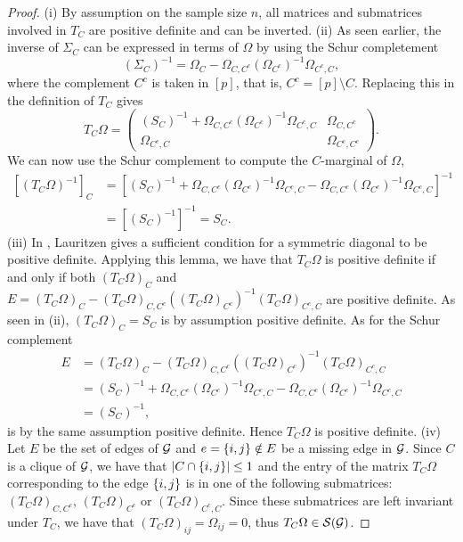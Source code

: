 \begin{proof}
    (i) By assumption on the sample size $n$, all matrices and submatrices involved in $T_C$ are positive definite and can be inverted.
    \newline
    (ii) As seen earlier, the inverse of $\Sigma_C$ can be expressed in terms of $\Omega$ by using the Schur completement
    \begin{equation*}
        (\Sigma_C)^{-1} = \Omega_C - \Omega_{C, C^c}(\Omega_{C^c})^{-1}\Omega_{C^c, C},
    \end{equation*}
    where the complement $C^c$ is taken in $[p]$, that is, $C^c = [p] \setminus C$. Replacing this in the definition of $T_C$ gives
    \begin{equation} \label{eq-tc-2}
        T_C \Omega = \begin{pmatrix}
            (S_C)^{-1} + \Omega_{C, C^c}(\Omega_{C^c})^{-1}\Omega_{C^c, C} & \Omega_{C, C^c}\\
            \Omega_{C^c, C} & \Omega_{C^c, C^c}
            \end{pmatrix}.
    \end{equation}
    We can now use the Schur complement to compute the $C$-marginal of $\Omega$,
    \begin{align*}
        \left[(T_C \Omega)^{-1}\right]_C 
        &= \left[ (S_C)^{-1} + \Omega_{C, C^c}(\Omega_{C^c})^{-1}\Omega_{C^c, C} - \Omega_{C, C^c}(\Omega_{C^c})^{-1}\Omega_{C^c, C} \right]^{-1}\\
        &= \left[ (S_C)^{-1}\right]^{-1} = S_C.
    \end{align*}
    (iii) In \cite[Proposition B.1]{lauritzen1996}, Lauritzen gives a sufficient condition for a symmetric diagonal to be positive definite. Applying this lemma, we have that $T_C \Omega$ is positive definite if and only if both $(T_C \Omega)_C$ and $E = (T_C \Omega)_C - (T_C \Omega)_{C, C^c}((T_C \Omega)_{C^c})^{-1}(T_C \Omega)_{C^c,C}$ are positive definite. As seen in (ii), $(T_C \Omega)_C = S_C$ is by assumption positive definite. As for the Schur complement
    \begin{align*}
        E &= (T_C \Omega)_C - (T_C \Omega)_{C, C^c}((T_C \Omega)_{C^c})^{-1}(T_C \Omega)_{C^c,C}\\
        &= (S_C)^{-1} + \Omega_{C, C^c}(\Omega_{C^c})^{-1}\Omega_{C^c, C} - \Omega_{C, C^c}(\Omega_{C^c})^{-1}\Omega_{C^c,C}\\
        &= (S_C)^{-1},
    \end{align*}
    is by the same assumption positive definite. Hence $T_C \Omega$ is positive definite.
    \newline
    (iv) Let $E$ be the set of edges of ${\mathcal{G}}$ and $e = {\left\{i, j\right\}} \notin E$ be a missing edge in ${\mathcal{G}}$. Since $C$ is a clique of ${\mathcal{G}}$, we have that $|C \cap {\left\{i, j\right\}}| \leq 1$ and the entry of the matrix $T_C \Omega$ corresponding to the edge ${\left\{i, j\right\}}$ is in one of the following submatrices: $(T_C \Omega)_{C, C^c}$, $(T_C \Omega)_{C^c}$ or $(T_C \Omega)_{C^c,C}$. Since these submatrices are left invariant under $T_C$, we have that $(T_C \Omega)_{ij} = \Omega_{ij} = 0$, thus $T_C \Omega \in {\mathcal{S}}({\mathcal{G}})$.
\end{proof}

